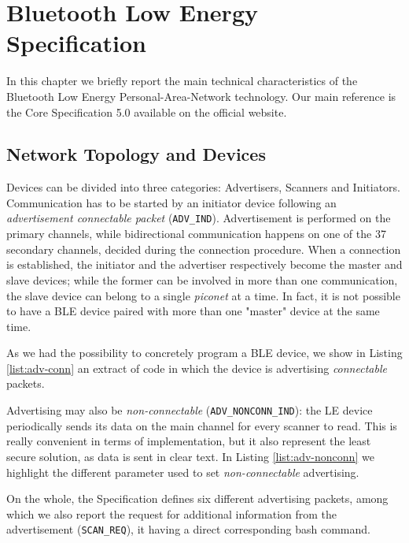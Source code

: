 \chapter{Bluetooth Low Energy Specification}
\label{chapter2}
\thispagestyle{empty}

\noindent In this chapter we briefly report the main technical characteristics of the Bluetooth Low Energy Personal-Area-Network technology. Our main reference is the Core Specification 5.0 available on the official website.

\section{Network Topology and Devices}
Devices can be divided into three categories: Advertisers, Scanners and Initiators. 
Communication has to be started by an initiator device following an \textit{advertisement connectable packet} (\texttt{ADV\_IND}). Advertisement is performed on the primary channels, while bidirectional communication happens on one of the 37 secondary channels, decided during the connection procedure. When a connection is established, the initiator and the advertiser respectively become the master and slave devices; while the former can be involved in more than one communication, the slave device can belong to a single \textit{piconet} at a time. In fact, it is not possible to have a BLE device paired with more than one "master" device at the same time.

As we had the possibility to concretely program a BLE device, we show in Listing \ref{list:adv-conn} an extract of code in which the device is advertising \textit{connectable} packets.


Advertising may also be \textit{non-connectable} (\texttt{ADV\_NONCONN\_IND}): the LE device periodically sends its data on the main channel for every scanner to read. This is really convenient in terms of implementation, but it also represent the least secure solution, as data is sent in clear text. In Listing \ref{list:adv-nonconn} we highlight the different parameter used to set \textit{non-connectable} advertising.


On the whole, the Specification defines six different advertising packets, among which we also report the request for additional information from the advertisement (\texttt{SCAN\_REQ}), it having a direct corresponding bash command.

